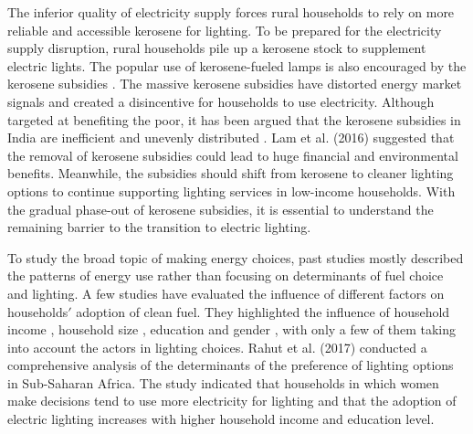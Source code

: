 \documentclass[11pt,english]{article}
\theoremstyle{plain} \newtheorem{claim}{Claim}
\theoremstyle{plain} \newtheorem{prop}{Proposition}
\theoremstyle{plain} \newtheorem{hypo}{Hypothesis}
\begin{document}
The inferior quality of electricity supply forces rural households to rely on more reliable and accessible kerosene for lighting. To be prepared for the electricity supply disruption, rural households pile up a kerosene stock to supplement electric lights. The popular use of kerosene-fueled lamps is also encouraged by the kerosene subsidies \citep{Rehmanetal2005, Lametal2016}. The massive kerosene subsidies have distorted energy market signals and created a disincentive for households to use electricity. Although targeted at benefiting the poor, it has been argued that the kerosene subsidies in India are inefficient and unevenly distributed \citep{Rehmanetal2005, Lametal2016}. Lam et al. (2016) \citep{Lametal2016} suggested that the removal of kerosene subsidies could lead to huge financial and environmental benefits. Meanwhile, the subsidies should shift from kerosene to cleaner lighting options to continue supporting lighting services in low-income households. With the gradual phase-out of kerosene subsidies, it is essential to understand the remaining barrier to the transition to electric lighting.

To study the broad topic of making energy choices, past studies mostly described the patterns of energy use rather than focusing on determinants of fuel choice and lighting. A few studies have evaluated the influence of different factors on households$'$ adoption of clean fuel. They highlighted the influence of household income \citep{ReddySrinivas2009}, household size \citep{Heltberg2004}, education \citep{Heltberg2004} and gender \citep{Beheraetal2017}, with only a few of them taking into account the actors in lighting choices. Rahut et al. (2017) \citep{Rahutetal2017} conducted a comprehensive analysis of the determinants of the preference of lighting options in Sub-Saharan Africa. The study indicated that households in which women make decisions tend to use more electricity for lighting and that the adoption of electric lighting increases with higher household income and education level.
\end{document}

